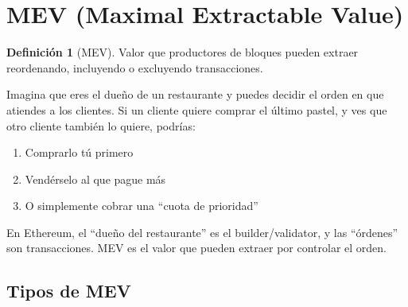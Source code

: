 \documentclass[11pt,a4paper,twoside,openright]{book}
\theoremstyle{definition}
\newtheorem{definition}{Definición}[chapter]
\theoremstyle{plain}
\theoremstyle{remark}
\begin{document}
\section{MEV (Maximal Extractable Value)}

\begin{definition}[MEV]
Valor que productores de bloques pueden extraer reordenando, incluyendo o excluyendo transacciones.
\end{definition}

\begin{intuicion}
Imagina que eres el dueño de un restaurante y puedes decidir el orden en que atiendes a los clientes. Si un cliente quiere comprar el último pastel, y ves que otro cliente también lo quiere, podrías:
\begin{enumerate}
    \item Comprarlo tú primero
    \item Vendérselo al que pague más
    \item O simplemente cobrar una ``cuota de prioridad''
\end{enumerate}

En Ethereum, el ``dueño del restaurante'' es el builder/validator, y las ``órdenes'' son transacciones. MEV es el valor que pueden extraer por controlar el orden.
\end{intuicion}

\subsection{Tipos de MEV}
\end{document}
